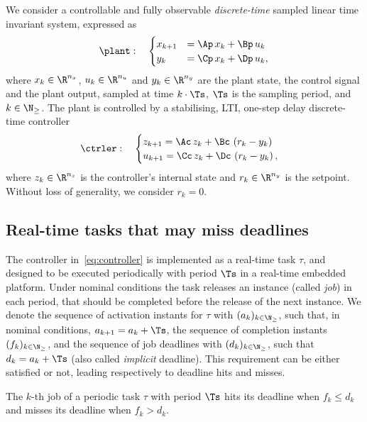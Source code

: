 We consider a controllable and fully observable \emph{discrete-time} sampled linear time invariant system, expressed as
\begin{equation}%
    \label{eq:plant}%
    \plant:\quad
    \begin{cases}
        x_{k+1} &= \Ap\,x_k + \Bp\,u_k \\
        y_{k} &= \Cp\,x_k + \Dp\,u_k,
    \end{cases}
\end{equation}
where $x_k \in \R^{n_x}$, $u_k \in \R^{n_u}$ and $y_k \in \R^{n_y}$ are the plant state, the control signal and the plant output, sampled at time $k\cdot \Ts$, $\Ts$ is the sampling period, and $k \in \N_{\geq}$.
The plant is controlled by a stabilising, LTI, one-step delay discrete-time controller
\begin{equation}%
    \label{eq:controller}%
    \ctrler:\quad
    \begin{cases}
        z_{k+1} = \Ac\,z_k + \Bc\,\left(r_k - y_k\right) \\
        u_{k+1} = \Cc\,z_k + \Dc\,\left(r_k - y_k\right),
    \end{cases}
\end{equation}
where $z_k \in \R^{n_z}$ is the controller's internal state and $r_k \in \R^{n_y}$ is the setpoint.
Without loss of generality, we consider $r_k = 0$.


\subsection{Real-time tasks that may miss deadlines}
\label{ssec:whalgebra}

The controller in~\eqref{eq:controller} is implemented as a real-time task $\tau$, and designed to be executed periodically with period $\Ts$ in a real-time embedded platform.
Under nominal conditions the task releases an instance (called \emph{job}) in each period, that should be completed before the release of the next instance.
We denote the sequence of activation instants for $\tau$ with $(a_k)_{k \in \N_{\geq}}$, such that, in nominal conditions, $a_{k+1} = a_k+\Ts$, the sequence of completion instants $(f_k)_{k \in \N_{\geq}}$, and the sequence of job deadlines with $(d_k)_{k \in \N_{\geq}}$, such that $d_k = a_k + \Ts$ (also called \emph{implicit} deadline).
This requirement can be either satisfied or not, leading respectively to deadline hits and misses.

\begin{definition}%
    \label{def:hit}%
    The $k$-th job of a periodic task $\tau$ with period $\Ts$ hits its deadline when $f_k \leq d_k$ and misses its deadline when $f_k > d_k$.
\end{definition}

